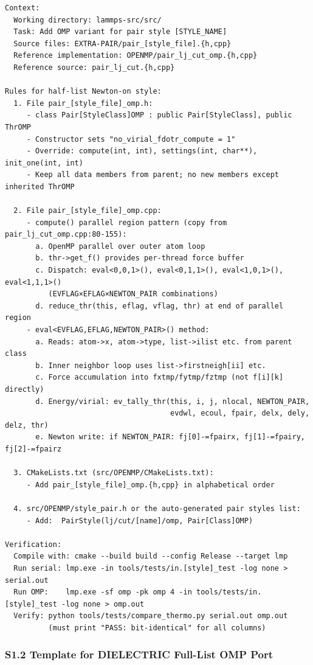 \documentclass[
  11pt,
]{article}
\newcounter{none} %
\begin{document}
\begin{verbatim}
Context:
  Working directory: lammps-src/src/
  Task: Add OMP variant for pair style [STYLE_NAME]
  Source files: EXTRA-PAIR/pair_[style_file].{h,cpp}
  Reference implementation: OPENMP/pair_lj_cut_omp.{h,cpp}
  Reference source: pair_lj_cut.{h,cpp}

Rules for half-list Newton-on style:
  1. File pair_[style_file]_omp.h:
     - class Pair[StyleClass]OMP : public Pair[StyleClass], public ThrOMP
     - Constructor sets "no_virial_fdotr_compute = 1"
     - Override: compute(int, int), settings(int, char**), init_one(int, int)
     - Keep all data members from parent; no new members except inherited ThrOMP

  2. File pair_[style_file]_omp.cpp:
     - compute() parallel region pattern (copy from pair_lj_cut_omp.cpp:80-155):
       a. OpenMP parallel over outer atom loop
       b. thr->get_f() provides per-thread force buffer
       c. Dispatch: eval<0,0,1>(), eval<0,1,1>(), eval<1,0,1>(), eval<1,1,1>()
          (EVFLAG×EFLAG×NEWTON_PAIR combinations)
       d. reduce_thr(this, eflag, vflag, thr) at end of parallel region
     - eval<EVFLAG,EFLAG,NEWTON_PAIR>() method:
       a. Reads: atom->x, atom->type, list->ilist etc. from parent class
       b. Inner neighbor loop uses list->firstneigh[ii] etc.
       c. Force accumulation into fxtmp/fytmp/fztmp (not f[i][k] directly)
       d. Energy/virial: ev_tally_thr(this, i, j, nlocal, NEWTON_PAIR,
                                      evdwl, ecoul, fpair, delx, dely, delz, thr)
       e. Newton write: if NEWTON_PAIR: fj[0]-=fpairx, fj[1]-=fpairy, fj[2]-=fpairz
  
  3. CMakeLists.txt (src/OPENMP/CMakeLists.txt):
     - Add pair_[style_file]_omp.{h,cpp} in alphabetical order
  
  4. src/OPENMP/style_pair.h or the auto-generated pair styles list:
     - Add:  PairStyle(lj/cut/[name]/omp, Pair[Class]OMP)

Verification:
  Compile with: cmake --build build --config Release --target lmp
  Run serial: lmp.exe -in tools/tests/in.[style]_test -log none > serial.out
  Run OMP:    lmp.exe -sf omp -pk omp 4 -in tools/tests/in.[style]_test -log none > omp.out
  Verify: python tools/tests/compare_thermo.py serial.out omp.out
          (must print "PASS: bit-identical" for all columns)
\end{verbatim}

\subsubsection{S1.2 Template for DIELECTRIC Full-List OMP
Port}\label{s1.2-template-for-dielectric-full-list-omp-port}
\end{document}
